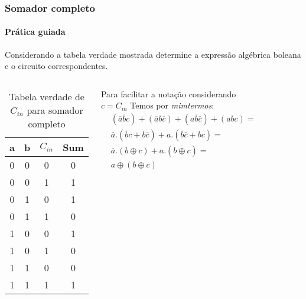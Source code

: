 \begin{frame}
	\frametitle{Somador completo}
	\framesubtitle{\textbf{Prática guiada}}
	\par Considerando a tabela verdade mostrada determine a expressão algébrica boleana e o circuito correspondentes.
	\begin{columns}
			\begin{table}[h!]
				\centering
				\begin{tabular}{|c|c|c|c|}
					\hline
					a & b & $C_{in}$ & Sum \\
					\hline
					0 & 0 & 0 & 0 \\
					0 & 0 & 1 & 1 \\
					0 & 1 & 0 & 1 \\
					0 & 1 & 1 & 0 \\
					1 & 0 & 0 & 1 \\
					1 & 0 & 1 & 0 \\
					1 & 1 & 0 & 0 \\
					1 & 1 & 1 & 1 \\
					\hline
				\end{tabular}
				\caption{Tabela verdade de $C_{in}$ para somador completo}
				\label{tab:full_adder2}
			\end{table}
			\pause
			\par Para facilitar a notação considerando $c=C_{in}$ Temos por \textit{mimtermos}:
			\begin{equation}
				\begin{aligned}
					&(\overline{a}\overline{b}c)+(\overline{a}b\overline{c})+(a\overline{b}\overline{c})+(abc) = \\
					&\overline{a}.(\overline{b}c+b\overline{c}) + a.(\overline{b}\overline{c}+bc) = \\
					&\overline{a}.(b \oplus c) + a.(\overline{b \oplus c}) = \\
					& \boxed{a \oplus (b \oplus c)}
				\end{aligned}
			\end{equation}
			\vspace{-0.5cm}
			\pause
			\begin{figure}
				\centering
				
				\label{fig:somadorcompletoparte01}
			\end{figure}
	\end{columns}
\end{frame}
